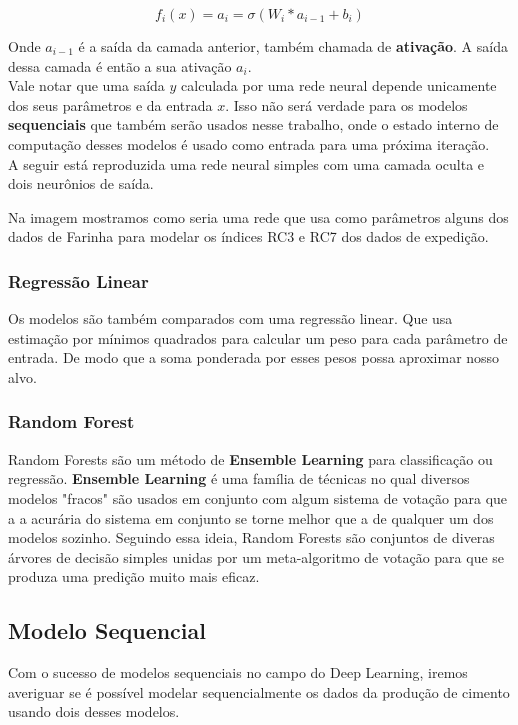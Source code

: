 \[ f_i (x)=  a_i = \sigma(W_i*a_{i-1} + b_i) \]

Onde $a_{i-1}$ é a saída da camada anterior, também chamada de
\textbf{ativação}. A saída dessa camada é então a sua ativação $a_i$. \\ 

Vale notar que uma saída $y$ calculada por uma rede neural depende unicamente dos
seus parâmetros e da entrada $x$. Isso não será verdade para os modelos
\textbf{sequenciais} que também serão usados nesse trabalho, onde o estado
interno de computação desses modelos é usado como entrada para uma próxima
iteração. \\

A seguir está reproduzida uma rede neural simples com uma camada oculta e dois neurônios de saída.


%


Na imagem mostramos como seria uma rede que usa como parâmetros alguns dos dados de Farinha para modelar os índices RC3 e RC7 dos dados de expedição.

\bigskip
\subsubsection{Regressão Linear}
Os modelos são também comparados com uma regressão linear. Que usa estimação por mínimos quadrados para calcular um peso para cada parâmetro de entrada. De modo que a soma ponderada por esses pesos possa aproximar nosso alvo.


\subsubsection{Random Forest}

Random Forests são um método de \textbf{Ensemble Learning} para classificação ou regressão. \textbf{Ensemble Learning} é uma família de técnicas no qual diversos modelos "fracos" são usados em conjunto com algum sistema de votação para que a a acurária do sistema em conjunto se torne melhor que a de qualquer um dos modelos sozinho. Seguindo essa ideia, Random Forests são conjuntos de diveras árvores de decisão simples unidas por um meta-algoritmo de votação para que se produza uma predição muito mais eficaz.


\subsection{Modelo Sequencial}
Com o sucesso de modelos sequenciais no campo do Deep Learning, iremos averiguar se é possível modelar sequencialmente os dados da produção de cimento usando dois desses modelos. 
\\

